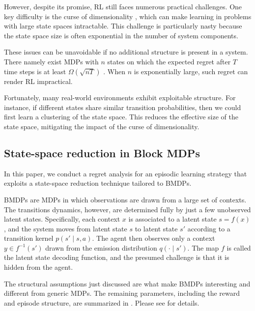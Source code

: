 \documentclass[11pt]{article}
\theoremstyle{definition}
\theoremstyle{definition}
\begin{document}
However, despite its promise, \gls{RL} still faces numerous practical challenges.
One key difficulty is the curse of dimensionality \cite{sutton2020reinforcement}, which can make learning in problems with large state spaces intractable.
This challenge is particularly nasty because the state space size is often exponential in the number of system components.

These issues can be unavoidable if no additional structure is present in a system.
There namely exist \glspl{MDP} with $n$ states on which the expected regret after $T$ time steps is at least $\Omega(\sqrt{nT})$ \cite{osband2016lower}.
When $n$ is exponentially large, such regret can render \gls{RL} impractical.

Fortunately, many real-world environments exhibit exploitable structure.
For instance, if different states share similar transition probabilities, then we could first learn a clustering of the state space.
This reduces the effective size of the state space, mitigating the impact of the curse of dimensionality.

\subsection{State-space reduction in Block MDPs}
\label{sec:this_paper}

In this paper, we conduct a regret analysis for an episodic learning strategy that exploits a state-space reduction technique tailored to \glspl{BMDP}.

\glspl{BMDP} \cite{NIPS2016_2387337b} are \glspl{MDP} in which observations are drawn from a large set of contexts.
The transitions dynamics, however, are determined fully by just a few unobserved latent states.
Specifically, each context $x$ is associated to a latent state $s = f(x)$, and the system moves from latent state $s$ to latent state $s'$ according to a transition kernel $p(s' \mid s,a)$.
The agent then observes only a context $y \in f^{-1}(s')$ drawn from the emission distribution $q( \cdot \mid s')$.
The map $f$ is called the latent state decoding function, and the presumed challenge is that it is hidden from the agent.

The structural assumptions just discussed are what make \glspl{BMDP} interesting and different from generic \glspl{MDP}.
The remaining parameters, including the reward and episode structure, are summarized in .
Please see  for details.
\end{document}

